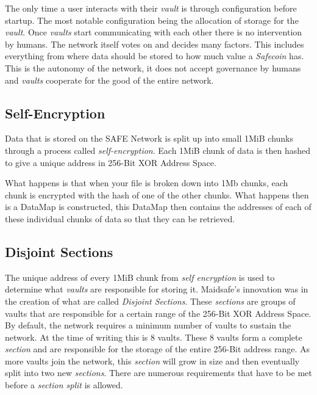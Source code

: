 The only time a user interacts with their \textit{vault} is through configuration before startup. The most notable configuration being the allocation of storage for the \textit{vault}. Once \textit{vaults} start communicating with each other there is no intervention by humans. The network itself votes on and decides many factors. This includes everything from where data should be stored to how much value a \textit{Safecoin} has. This is the autonomy of the network, it does not accept governance by humans and \textit{vaults} cooperate for the good of the entire network.

\subsection{Self-Encryption}
\label{subsec:self-encryption}

Data that is stored on the SAFE Network is split up into small 1MiB chunks through a process called \textit{self-encryption}. Each 1MiB chunk of data is then hashed to give a unique address in 256-Bit XOR Address Space.

What happens is that when your file is broken down into 1Mb chunks, each chunk is encrypted with the hash of one of the other chunks. What happens then is a DataMap is constructed, this DataMap then contains the addresses of each of these individual chunks of data so that they can be retrieved.

\subsection{Disjoint Sections}

The unique address of every 1MiB chunk from \textit{self encryption} is used to determine what \textit{vaults} are responsible for storing it. Maidsafe's innovation was in the creation of what are called \textit{Disjoint Sections}. These \textit{sections} are groups of vaults that are responsible for a certain range of the 256-Bit XOR Address Space. By default, the network requires a minimum number of vaults to sustain the network. At the time of writing this is 8 vaults. These 8 vaults form a complete \textit{section} and are responsible for the storage of the entire 256-Bit address range. As more vaults join the network, this \textit{section} will grow in size and then eventually split into two new \textit{sections}. There are numerous requirements that have to be met before a \textit{section split} is allowed.


